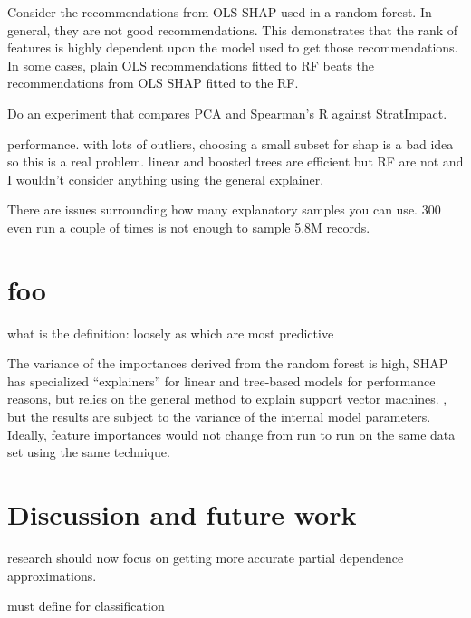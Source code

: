 \documentclass[12pt]{article}
\begin{document}
Consider the recommendations from OLS SHAP used in a random forest. In general, they are not good recommendations. This demonstrates that the rank of features is highly dependent upon the model used to get those recommendations. In some cases, plain OLS recommendations fitted to RF beats the recommendations from OLS SHAP fitted to the RF.

Do an experiment that compares PCA and Spearman's R against StratImpact.

performance. with lots of outliers, choosing a small subset for shap is a bad idea so this is a real problem. linear and boosted trees are efficient but RF are not and I wouldn't consider anything using the general explainer.

There are issues surrounding how many explanatory samples you can use. 300 even run a couple of times is not enough to sample 5.8M records.
 
\section{foo}

 what is the definition: loosely as which are most predictive

The variance of the importances derived from the random forest is high, SHAP has specialized ``explainers'' for linear and tree-based models for performance reasons, but relies on the general method to explain support vector machines. , but the results are subject to the variance of the internal model parameters.  Ideally, feature importances would not change from run to run on the same data set using the same technique.

\section{Discussion and future work}

research should now focus on getting more accurate partial dependence approximations.

must define for classification




\end{document}
